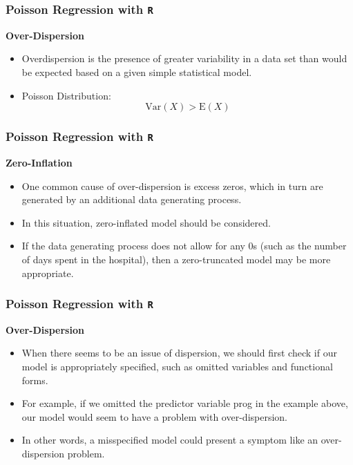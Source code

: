 \documentclass[MASTER.tex]{subfiles}
\begin{document}
\begin{frame}[fragile]

\frametitle{Poisson Regression with \texttt{R}}
\Large
\textbf{Over-Dispersion}\\ 
\begin{itemize}
\item Overdispersion is the presence of greater variability
 in a data set than would be expected based on a given simple statistical model.
\item Poisson Distribution:
\[ \mathrm{Var}(X) >  \mathrm{E}(X) \]
\end{itemize}
\end{frame}

\begin{frame}[fragile]
\frametitle{Poisson Regression with \texttt{R}}
\Large
  \textbf{Zero-Inflation}
	\begin{itemize}
		\item One common cause of over-dispersion is excess zeros, which in turn are generated by an additional data generating 
		process. 
		\item In this situation, zero-inflated model should be considered.
		\item If the data generating process does not allow for any 0s (such as the number of days spent in the hospital), then a zero-truncated model may be more appropriate.
	\end{itemize}
\end{frame}
\begin{frame}[fragile]

\frametitle{Poisson Regression with \texttt{R}}
\Large
\textbf{Over-Dispersion}
\begin{itemize}

 \item When there seems to be an issue of dispersion, we should first check if our model is appropriately specified, 
 such as omitted variables and functional forms. 
 \item For example, if we omitted the predictor variable prog in the example above, our model would seem to have a 
 problem with over-dispersion. 
 \item In other words, a misspecified model could present a symptom like an over-dispersion problem. 
\end{itemize}
\end{frame}
\end{document}
